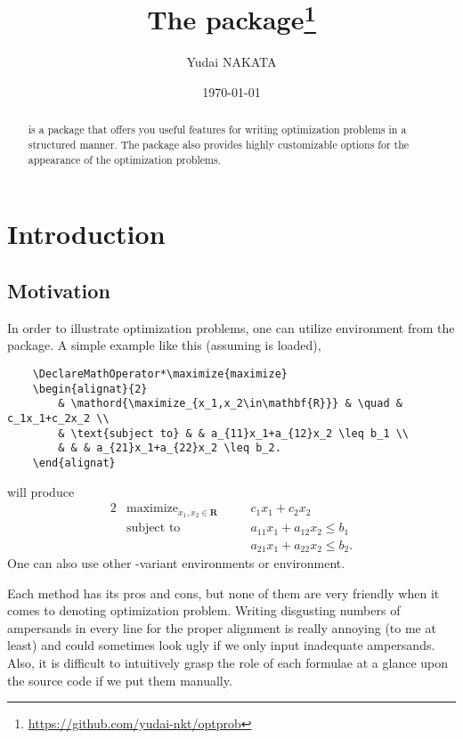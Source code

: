 \documentclass[a4paper,10pt]{article}
\title{The \sty{optprob} package\footnote{\url{https://github.com/yudai-nkt/optprob}}}
\author{Yudai NAKATA}
\date{\today}
\DeclareMathOperator*\maximize{maximize}
\begin{document}
\maketitle
\begin{abstract}
     is a package that offers you useful features for writing optimization problems in a structured manner.
    The package also provides highly customizable options for the appearance of the optimization problems.
\end{abstract}
\tableofcontents
\section{Introduction}
\subsection{Motivation}
In order to illustrate optimization problems, one can utilize  environment from the  package.
A simple example like this (assuming  is loaded),

\begin{verbatim}
    \DeclareMathOperator*\maximize{maximize}
    \begin{alignat}{2}
        & \mathord{\maximize_{x_1,x_2\in\mathbf{R}}} & \quad & c_1x_1+c_2x_2 \\
        & \text{subject to} & & a_{11}x_1+a_{12}x_2 \leq b_1 \\
        & & & a_{21}x_1+a_{22}x_2 \leq b_2.
    \end{alignat}
\end{verbatim}
will produce
\begin{alignat}{2}
    & \mathord{\maximize_{x_1,x_2\in\mathbf{R}}} & \quad & c_1x_1+c_2x_2 \\
    & \text{subject to} & & a_{11}x_1+a_{12}x_2 \leq b_1 \\
    & & & a_{21}x_1+a_{22}x_2 \leq b_2.
\end{alignat}
One can also use other -variant environments or  environment.

Each method has its pros and cons, but none of them are very friendly when it comes to denoting optimization problem.
Writing disgusting numbers of ampersands in every line for the proper alignment is really annoying (to me at least) and could sometimes look ugly if we only input inadequate ampersands.
Also, it is difficult to intuitively grasp the role of each formulae at a glance upon the source code if we put them manually.
\end{document}
